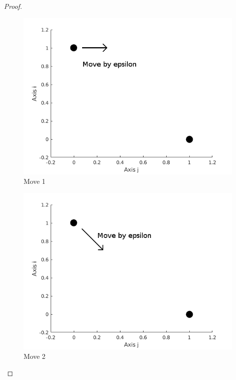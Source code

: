 \documentclass{article}[11pt]
\begin{document}
\begin{proof}
  \begin{figure}
    \centering
    \includegraphics[width = 0.6\linewidth]{move1.png}
    \caption{Move 1}
    \label{fig:move1}
  \end{figure}
  \begin{figure}
    \centering
    \includegraphics[width = 0.6\linewidth]{move2.png}
    \caption{Move 2}
    \label{fig:move2}
  \end{figure}
\end{proof}
\end{document}
